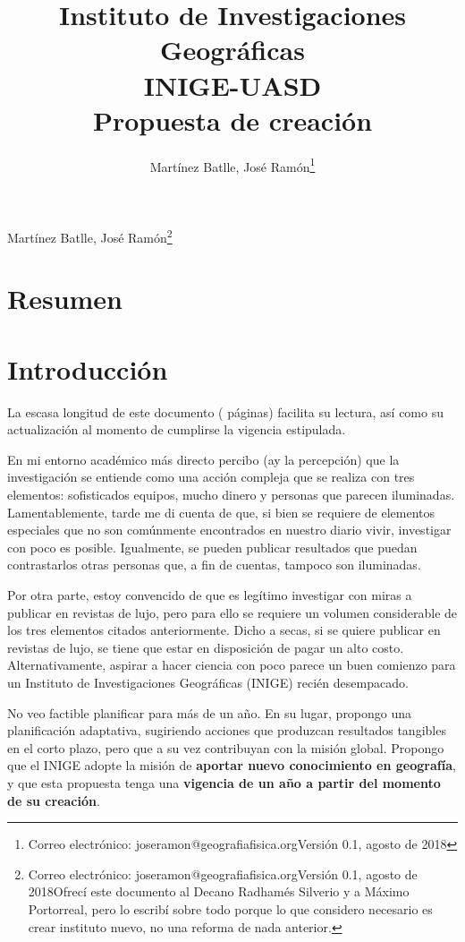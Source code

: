 \documentclass[12pt,letterpaper,spanish]{article}
\title{Instituto de Investigaciones Geográficas \\ INIGE-UASD \\ \large Propuesta de creación}
\author{Martínez Batlle, José Ramón\footnote{Correo electrónico: joseramon@geografiafisica.org\newline Versión 0.1, agosto de 2018}}
\newcommand\numpag{\pageref{LastPage}}
\newcommand{\ent}{Instituto de Investigaciones Geográficas}
\newcommand{\entacron}{INIGE}
\begin{document}
\makeatletter
\begin{center}
{\LARGE \@title \par}
\makeatother
Martínez Batlle, José Ramón\footnote{Correo electrónico: joseramon@geografiafisica.org\newline Versión 0.1, agosto de 2018\newline Ofrecí este documento al Decano Radhamés Silverio y  a Máximo Portorreal, pero lo escribí sobre todo porque lo que considero necesario es crear instituto nuevo, no una reforma de nada anterior.}
\end{center}

\tableofcontents%

\linenumbers

\section*{Resumen} \label{resumen}

\section{Introducción} \label{introduccion}

La escasa longitud de este documento (\numpag{} páginas) facilita su lectura, así como su actualización al momento de cumplirse la vigencia estipulada.

En mi entorno académico más directo percibo (ay la percepción) que la investigación se entiende como una acción compleja que se realiza con tres elementos: sofisticados equipos, mucho dinero y personas que parecen iluminadas. Lamentablemente, tarde me di cuenta de que, si bien se requiere de elementos especiales que no son comúnmente encontrados en nuestro diario vivir, investigar con poco es posible. Igualmente, se pueden publicar resultados que puedan contrastarlos otras personas que, a fin de cuentas, tampoco son iluminadas.

Por otra parte, estoy convencido de que es legítimo investigar con miras a publicar en revistas de lujo, pero para ello se requiere un volumen considerable de los tres elementos citados anteriormente. Dicho a secas, si se quiere publicar en revistas de lujo, se tiene que estar en disposición de pagar un alto costo. Alternativamente, aspirar a hacer ciencia con poco parece un buen comienzo para un \ent{} (\entacron) recién desempacado.

No veo factible planificar para más de un año. En su lugar, propongo una planificación adaptativa, sugiriendo acciones que produzcan resultados tangibles en el corto plazo, pero que a su vez contribuyan con la misión global. Propongo que el \entacron{} adopte la misión de \textbf{aportar nuevo conocimiento en geografía}, y que esta propuesta tenga una \textbf{vigencia de un año a partir del momento de su creación}.
\end{document}
